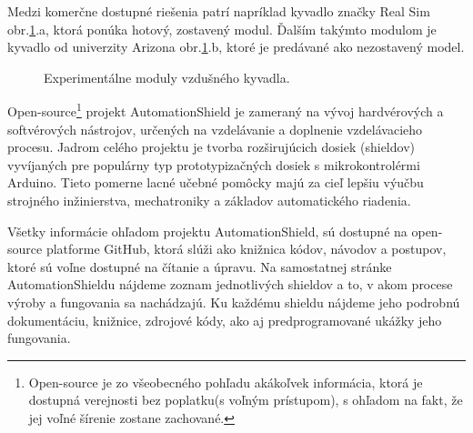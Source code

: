 Medzi komerčne dostupné riešenia patrí napríklad kyvadlo značky Real Sim obr.\ref{OBRAZOK 1.2}.a, ktorá ponúka hotový, zostavený modul. Ďalším takýmto modulom je kyvadlo od univerzity Arizona\cite{enikov_campa_2012} obr.\ref{OBRAZOK 1.2}.b, ktoré je predávané ako nezostavený model. 

\begin{figure}[!tbh]
	\hfill
	\hfill
	\hfill
	\caption{Experimentálne moduly vzdušného kyvadla.}\label{OBRAZOK 1.2}
\end{figure}

\newpage
Open-source\footnote[1]{Open-source je zo všeobecného pohľadu akákoľvek informácia, ktorá je dostupná verejnosti bez poplatku(s voľným prístupom), s ohľadom na fakt, že jej voľné šírenie zostane zachované.} projekt AutomationShield je zameraný na vývoj hardvérových a softvérových nástrojov, určených na vzdelávanie a doplnenie vzdelávacieho procesu. Jadrom celého projektu je tvorba rozširujúcich dosiek (shieldov) vyvíjaných pre populárny typ prototypizačných dosiek s mikrokontrolérmi Arduino. Tieto pomerne lacné učebné pomôcky majú za cieľ lepšiu výučbu strojného inžinierstva, mechatroniky a základov automatického riadenia\cite{Auto}.

Všetky informácie ohľadom projektu AutomationShield, sú dostupné na open-source platforme GitHub\cite{Git}, ktorá slúži ako knižnica kódov, návodov a postupov, ktoré sú voľne dostupné na čítanie a úpravu. Na samostatnej stránke AutomationShieldu nájdeme zoznam jednotlivých shieldov a to, v akom procese výroby a fungovania sa nachádzajú. Ku každému shieldu nájdeme jeho podrobnú dokumentáciu, knižnice, zdrojové kódy, ako aj predprogramované ukážky jeho fungovania. 

